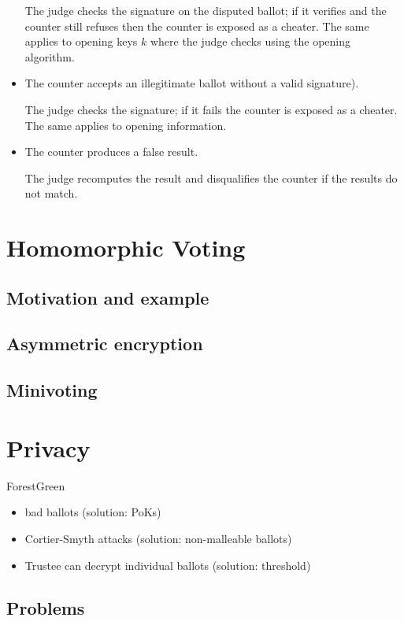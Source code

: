 \documentclass{llncs}
\newenvironment{structure}{
  \begin{color}{ForestGreen}
}{
  \end{color}
}
\begin{document}
\begin{itemize}
The judge checks the signature on the disputed ballot; if it verifies and the
counter still refuses then the counter is exposed as a cheater. The same applies
to opening keys $k$ where the judge checks using the opening algorithm.

\item The counter accepts an illegitimate ballot without a valid signature).

The judge checks the signature; if it fails the counter is exposed as a cheater.
The same applies to opening information.

\item The counter produces a false result.

The judge recomputes the result and disqualifies the counter if the results do
not match.
\end{itemize}

\section{Homomorphic Voting}

\subsection{Motivation and example}

\subsection{Asymmetric encryption}

\subsection{Minivoting}

\section{Privacy}

\begin{structure}
\begin{itemize}
\item bad ballots (solution: PoKs)
\item Cortier-Smyth attacks (solution: non-malleable ballots)
\item Trustee can decrypt individual ballots (solution: threshold)
\end{itemize}
\end{structure}

\subsection{Problems}
\end{document}
